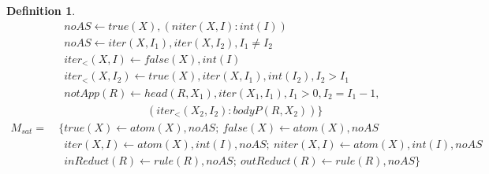 \documentclass[11pt,fleqn,twoside]{article}
\newtheorem{definition}{Definition}
\begin{document}
{\begin{definition}
\begin{align}
						& \phantom{\ \{} \mathit{noAS} \leftarrow \mathit{true}(X), (\mathit{niter}(X, I) : \mathit{int}(I))  \label{def:grewriting:5} \\
						& \phantom{\ \{} \mathit{noAS} \leftarrow \mathit{iter}(X, I_1), \mathit{iter}(X, I_2), I_1 \not= I_2  \label{def:grewriting:6} \\[0.6ex]
						& \phantom{\ \{} \mathit{iter}_{<}(X, I) \leftarrow \mathit{false}(X), \mathit{int}(I) \label{def:grewriting:6a} \\
						& \phantom{\ \{} \mathit{iter}_{<}(X, I_2) \leftarrow \mathit{true}(X), \mathit{iter}(X, I_1), \mathit{int}(I_2), I_2 > I_1 \label{def:grewriting:6aa} \\[0.6ex]
						& \phantom{\ \{} \mathit{notApp}(R) \leftarrow \mathit{head}(R, X_1), \mathit{iter}(X_1, I_1), I_1 > 0, I_2 = I_1 - 1, \label{def:grewriting:6b} \\
						& \phantom{\{ \mathit{notApp}(R) \leftarrow\ \ } (\mathit{iter}_{<}(X_2, I_2) : \mathit{bodyP}(R, X_2)) \} \nonumber \\[0.9ex]
					M_{\mathit{sat}} =& \ \{ \mathit{true}(X) \leftarrow \mathit{atom}(X), \mathit{noAS}; \ \mathit{false}(X) \leftarrow \mathit{atom}(X), \mathit{noAS}  \label{def:grewriting:12} \\
						& \phantom{\ \{} \mathit{iter}(X, I) \leftarrow \mathit{atom}(X), \mathit{int}(I), \mathit{noAS}; \ \mathit{niter}(X, I) \leftarrow \mathit{atom}(X), \mathit{int}(I), \mathit{noAS}  \label{def:grewriting:13} \\
						& \phantom{\ \{} \mathit{inReduct}(R) \leftarrow \mathit{rule}(R), \mathit{noAS}; \ \mathit{outReduct}(R) \leftarrow \mathit{rule}(R), \mathit{noAS} \} \label{def:grewriting:14}
				\end{align}
			\end{definition}
}
\end{document}
